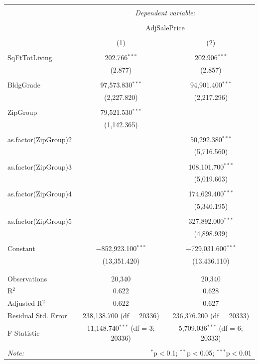 \documentclass[12pt,letterpaper]{article}
\begin{document}
\begin{table}[!htbp] \centering 
  \caption{} 
  \label{} 
\begin{tabular}{@{\extracolsep{5pt}}lcc} 
\\[-1.8ex]\hline 
\hline \\[-1.8ex] 
 & \multicolumn{2}{c}{\textit{Dependent variable:}} \\ 
\cline{2-3} 
\\[-1.8ex] & \multicolumn{2}{c}{AdjSalePrice} \\ 
\\[-1.8ex] & (1) & (2)\\ 
\hline \\[-1.8ex] 
 SqFtTotLiving & 202.766$^{***}$ & 202.906$^{***}$ \\ 
  & (2.877) & (2.857) \\ 
  & & \\ 
 BldgGrade & 97,573.830$^{***}$ & 94,901.400$^{***}$ \\ 
  & (2,227.820) & (2,217.296) \\ 
  & & \\ 
 ZipGroup & 79,521.530$^{***}$ &  \\ 
  & (1,142.365) &  \\ 
  & & \\ 
 as.factor(ZipGroup)2 &  & 50,292.380$^{***}$ \\ 
  &  & (5,716.560) \\ 
  & & \\ 
 as.factor(ZipGroup)3 &  & 108,101.700$^{***}$ \\ 
  &  & (5,019.663) \\ 
  & & \\ 
 as.factor(ZipGroup)4 &  & 174,629.400$^{***}$ \\ 
  &  & (5,340.195) \\ 
  & & \\ 
 as.factor(ZipGroup)5 &  & 327,892.000$^{***}$ \\ 
  &  & (4,898.939) \\ 
  & & \\ 
 Constant & $-$852,923.100$^{***}$ & $-$729,031.600$^{***}$ \\ 
  & (13,351.420) & (13,436.110) \\ 
  & & \\ 
\hline \\[-1.8ex] 
Observations & 20,340 & 20,340 \\ 
R$^{2}$ & 0.622 & 0.628 \\ 
Adjusted R$^{2}$ & 0.622 & 0.627 \\ 
Residual Std. Error & 238,138.700 (df = 20336) & 236,376.200 (df = 20333) \\ 
F Statistic & 11,148.740$^{***}$ (df = 3; 20336) & 5,709.036$^{***}$ (df = 6; 20333) \\ 
\hline 
\hline \\[-1.8ex] 
\textit{Note:}  & \multicolumn{2}{r}{$^{*}$p$<$0.1; $^{**}$p$<$0.05; $^{***}$p$<$0.01} \\ 
\end{tabular} 
\end{table} 
\end{document}
